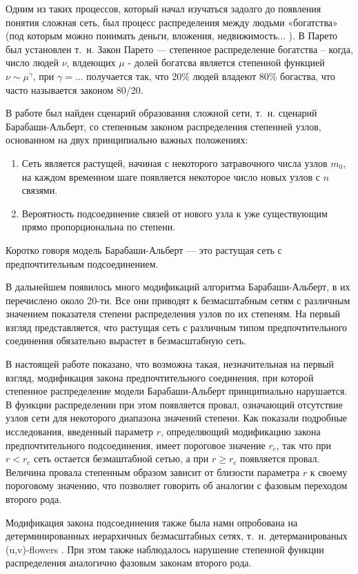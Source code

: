 \documentclass[10pt,aps,pra]{revtex4-1}
\begin{document}
Одним из таких процессов, который начал изучаться задолго до появления понятия сложная сеть, был процесс распределения между людьми «богатства» (под которым можно понимать деньги, вложения, недвижимость... ). В \cite{Pareto} Парето был установлен т. н. Закон Парето — степенное распределение богатства – когда, число людей $\nu$, влдеющих $\mu$ - долей богатсва является степенной функцией $\nu \sim \mu^\gamma$, при $\gamma=...$ получается так, что 20\% людей владеют 80\% богаства, что часто называется законом 80/20. 

В работе \cite{AlBa1} был найден сценарий образования сложной сети, т. н. сценарий Барабаши-Альберт, со степенным законом распределения степенней узлов, основанном на двух принципиально важных положениях:
\begin{enumerate} 
\item Сеть является растущей, начиная с некоторого затравочного числа узлов $m_0$, на каждом временном шаге появляется некоторое число новых узлов с $n$ связями.
\item Вероятность подсоединение связей от нового узла к уже существующим прямо пропорциональна по степени.
\end{enumerate}
Коротко говоря модель Барабаши-Альберт — это растущая сеть с предпочтительным подсоединением.

В дальнейшем появилось много модификаций алгоритма Барабаши-Альберт, в \cite{AlBa2} их перечислено около 20-ти. Все они приводят к безмасштабным сетям с различным значением показателя степени распределения узлов по их степеням. На первый взгляд представляется, что растущая сеть с различным типом предпочтительного соединения обязательно вырастет в безмасштабную сеть.

В настоящей работе показано, что возможна такая, незначительная на первый взгляд, модификация закона предпочтительного соединения, при которой степенное распределение модели Барабаши-Альберт принципиально нарушается. В функции распределении при этом появляется провал, означающий отсутствие узлов сети для некоторого диапазона значений степени. Как показали подробные исследования, введенный параметр $r$, определяющий модификацию закона предпочтительного подсоединения, имеет пороговое значение $r_c$, так что при $r<r_c$ сеть остается безмаштабной сетью, а при $r \geq r_c$ появляется провал. Величина провала степенным образом зависит от близости параметра $r$ к своему пороговому значению, что позволяет говорить об аналогии с фазовым переходом второго рода.

Модификация закона подсоединения также была нами опробована на детерминированных иерархичных безмасштабных сетях, т. н. детерманированых (u,v)-flowers \cite{Dor1}. При этом также наблюдалось нарушение степенной функции распределения аналогично фазовым законам второго рода.
\end{document}
